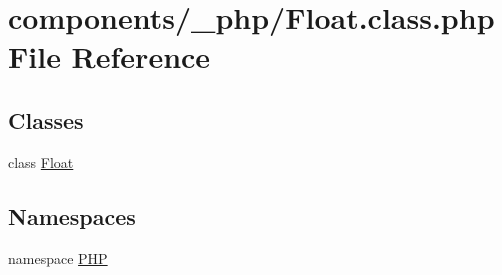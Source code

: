 \hypertarget{_float_8class_8php}{
\section{components/\_\-php/Float.class.php File Reference}
\label{_float_8class_8php}
}
\subsection*{Classes}
\begin{CompactItemize}
\item 
class \hyperlink{class_float}{Float}
\end{CompactItemize}
\subsection*{Namespaces}
\begin{CompactItemize}
\item 
namespace \hyperlink{namespace_p_h_p}{PHP}
\end{CompactItemize}
